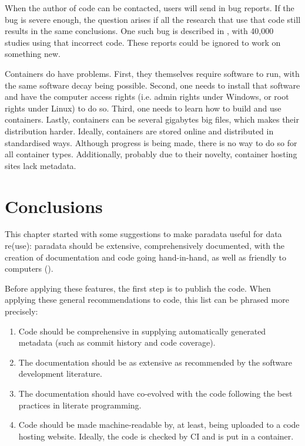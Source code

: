 
When the author of code can be contacted,
users will send in bug reports.
If the bug is severe enough, the question arises
if all the research that use that code still 
results in the same conclusions.
One such bug is described in \cite{eklund2016cluster},
with 40,000 studies using that incorrect code.
These reports could be ignored to work on something new.


Containers do have problems.
First, they themselves require software to run,
with the same software decay being possible.
Second, one needs to install that software and have the
computer access rights (i.e. admin rights under Windows, 
or root rights under Linux) to do so.
Third, one needs to learn how to build and use containers.
Lastly, containers can be several gigabytes big files,
which makes their distribution harder.
Ideally, containers are stored online and distributed in
standardised ways.
Although progress is being made, 
there is no way to do so for all container types.
Additionally, probably due to their novelty,
container hosting sites lack metadata.

\section{Conclusions}

This chapter started with some suggestions to 
make paradata useful for data re(use):
paradata should be extensive, comprehensively documented,
with the creation of documentation and code going hand-in-hand,
as well as friendly to computers (\cite{huvila2022improving}).

Before applying these features, the first step is to publish 
the code. 
When applying these general recommendations to code, 
this list can be phrased more precisely:

\begin{enumerate}
  \item Code should be comprehensive 
    in supplying automatically generated metadata (such as commit history and code coverage).
  \item The documentation should be as extensive as recommended by the 
    software development literature.
  \item The documentation should have co-evolved with the
    code following the best practices in literate programming. 
  \item Code should be made machine-readable by, at least,
    being uploaded to a code hosting website.
    Ideally, the code is checked by CI and is put in a container.
\end{enumerate}

